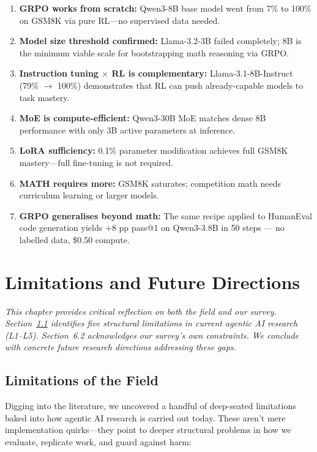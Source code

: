 \documentclass[12pt,a4paper]{report}
\theoremstyle{definition}
\begin{document}
\begin{tcolorbox}[colback=purple!5!white, colframe=purple!60!black, title=\textbf{Chapter 5 Key Takeaways (Empirical)}]
\begin{enumerate}
    \item \textbf{GRPO works from scratch:} Qwen3-8B base model went from 7\% to 100\% on GSM8K via pure RL---no supervised data needed.
    \item \textbf{Model size threshold confirmed:} Llama-3.2-3B failed completely; 8B is the minimum viable scale for bootstrapping math reasoning via GRPO.
    \item \textbf{Instruction tuning $\times$ RL is complementary:} Llama-3.1-8B-Instruct (79\% $\rightarrow$ 100\%) demonstrates that RL can push already-capable models to task mastery.
    \item \textbf{MoE is compute-efficient:} Qwen3-30B MoE matches dense 8B performance with only 3B active parameters at inference.
    \item \textbf{LoRA sufficiency:} 0.1\% parameter modification achieves full GSM8K mastery---full fine-tuning is not required.
    \item \textbf{MATH requires more:} GSM8K saturates; competition math needs curriculum learning or larger models.
    \item \textbf{GRPO generalises beyond math:} The same recipe applied to HumanEval code generation yields +8 pp pass@1 on Qwen3-3.8B in 50 steps --- no labelled data, \$0.50 compute.
\end{enumerate}
\end{tcolorbox}

\chapter{Limitations and Future Directions}
\label{ch:limitations}

\textit{This chapter provides critical reflection on both the field and our survey. Section~\ref{sec:field-limitations} identifies five structural limitations in current agentic AI research (L1--L5). Section~6.2 acknowledges our survey's own constraints. We conclude with concrete future research directions addressing these gaps.}

\vspace{0.3cm}
\section{Limitations of the Field}
\label{sec:field-limitations}
Digging into the literature, we uncovered a handful of deep-seated limitations baked into how agentic AI research is carried out today. These aren't mere implementation quirks---they point to deeper structural problems in how we evaluate, replicate work, and guard against harm:
\end{document}
